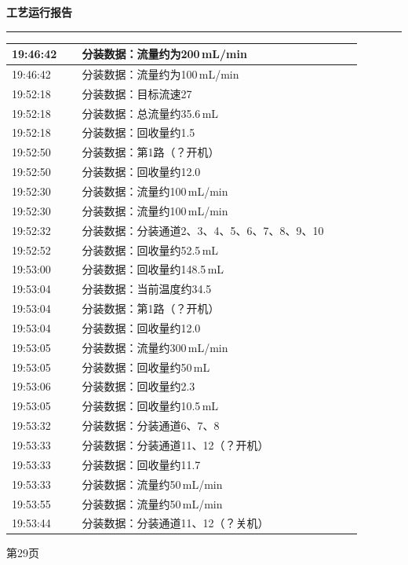 \documentclass[UTF8,10pt,a4paper,fontset=fandol]{ctexart}
\begin{document}

\newpage

\noindent
\begin{minipage}[t]{0.47\linewidth}
\centering
\textbf{工艺运行报告}

\vspace{2pt}
\hrule
\vspace{4pt}

\scriptsize
\begin{tabular}{|p{0.18\linewidth}|p{0.72\linewidth}|}
\hline
19:46:42 & 分装数据：流量约为200\,mL/min \\
\hline
19:46:42 & 分装数据：流量约为100\,mL/min \\
\hline
19:52:18 & 分装数据：目标流速27 \\
\hline
19:52:18 & 分装数据：总流量约35.6\,mL \\
\hline
19:52:18 & 分装数据：回收量约1.5 \\
\hline
19:52:50 & 分装数据：第1路（？开机） \\
\hline
19:52:50 & 分装数据：回收量约12.0 \\
\hline
19:52:30 & 分装数据：流量约100\,mL/min \\
\hline
19:52:30 & 分装数据：流量约100\,mL/min \\
\hline
19:52:32 & 分装数据：分装通道2、3、4、5、6、7、8、9、10 \\
\hline
19:52:52 & 分装数据：回收量约52.5\,mL \\
\hline
19:53:00 & 分装数据：回收量约148.5\,mL \\
\hline
19:53:04 & 分装数据：当前温度约34.5 \\
\hline
19:53:04 & 分装数据：第1路（？开机） \\
\hline
19:53:04 & 分装数据：回收量约12.0 \\
\hline
19:53:05 & 分装数据：流量约300\,mL/min \\
\hline
19:53:05 & 分装数据：回收量约50\,mL \\
\hline
19:53:06 & 分装数据：回收量约2.3 \\
\hline
19:53:05 & 分装数据：回收量约10.5\,mL \\
\hline
19:53:32 & 分装数据：分装通道6、7、8 \\
\hline
19:53:33 & 分装数据：分装通道11、12（？开机） \\
\hline
19:53:33 & 分装数据：回收量约11.7 \\
\hline
19:53:33 & 分装数据：流量约50\,mL/min \\
\hline
19:53:55 & 分装数据：流量约50\,mL/min \\
\hline
19:53:44 & 分装数据：分装通道11、12（？关机） \\
\hline
\end{tabular}

\vspace{3pt}
第29页
\end{minipage}
\end{document}
